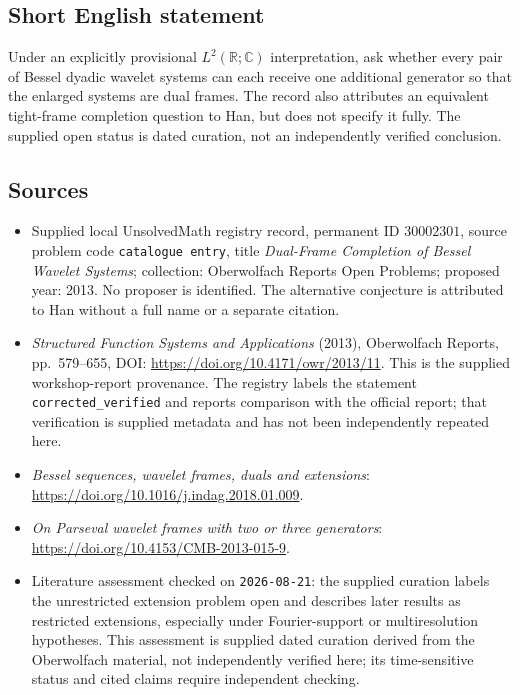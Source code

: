 \documentclass[11pt]{article}
\newcommand{\R}{\mathbb{R}}
\newcommand{\C}{\mathbb{C}}
\begin{document}
\subsection{Short English statement}
Under an explicitly provisional \(L^2(\R;\C)\) interpretation, ask whether every pair of Bessel dyadic wavelet systems can each receive one additional generator so that the enlarged systems are dual frames. The record also attributes an equivalent tight-frame completion question to Han, but does not specify it fully. The supplied open status is dated curation, not an independently verified conclusion.
\subsection{Sources}
\begin{itemize}
\item Supplied local UnsolvedMath registry record, permanent ID \(30002301\), source problem code \texttt{catalogue entry}, title \emph{Dual-Frame Completion of Bessel Wavelet Systems}; collection: Oberwolfach Reports Open Problems; proposed year: 2013. No proposer is identified. The alternative conjecture is attributed to Han without a full name or a separate citation.
\item \emph{Structured Function Systems and Applications} (2013), Oberwolfach Reports, pp.~579--655, DOI: \url{https://doi.org/10.4171/owr/2013/11}. This is the supplied workshop-report provenance. The registry labels the statement \texttt{corrected\_verified} and reports comparison with the official report; that verification is supplied metadata and has not been independently repeated here.
\item \emph{Bessel sequences, wavelet frames, duals and extensions}: \url{https://doi.org/10.1016/j.indag.2018.01.009}.
\item \emph{On Parseval wavelet frames with two or three generators}: \url{https://doi.org/10.4153/CMB-2013-015-9}.
\item Literature assessment checked on \texttt{2026-08-21}: the supplied curation labels the unrestricted extension problem open and describes later results as restricted extensions, especially under Fourier-support or multiresolution hypotheses. This assessment is supplied dated curation derived from the Oberwolfach material, not independently verified here; its time-sensitive status and cited claims require independent checking.
\end{itemize}
\end{document}
